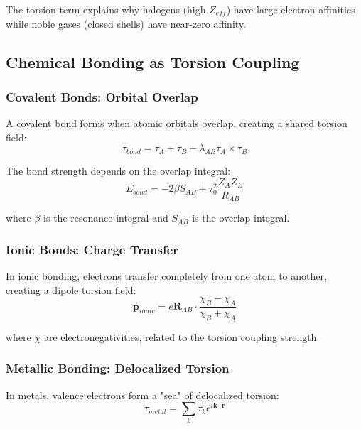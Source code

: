 The torsion term explains why halogens (high $Z_{eff}$) have large electron affinities while noble gases (closed shells) have near-zero affinity.

\subsection{Chemical Bonding as Torsion Coupling}

\subsubsection{Covalent Bonds: Orbital Overlap}

A covalent bond forms when atomic orbitals overlap, creating a shared torsion field:
\begin{equation}
    \tau_{bond} = \tau_A + \tau_B + \lambda_{AB} \tau_A \times \tau_B
\end{equation}

The bond strength depends on the overlap integral:
\begin{equation}
    E_{bond} = -2\beta S_{AB} + \tau_0^2 \frac{Z_A Z_B}{R_{AB}}
\end{equation}

where $\beta$ is the resonance integral and $S_{AB}$ is the overlap integral.

\subsubsection{Ionic Bonds: Charge Transfer}

In ionic bonding, electrons transfer completely from one atom to another, creating a dipole torsion field:
\begin{equation}
    \mathbf{p}_{ionic} = e \mathbf{R}_{AB} \cdot \frac{\chi_B - \chi_A}{\chi_B + \chi_A}
\end{equation}

where $\chi$ are electronegativities, related to the torsion coupling strength.

\subsubsection{Metallic Bonding: Delocalized Torsion}

In metals, valence electrons form a "sea" of delocalized torsion:
\begin{equation}
    \tau_{metal} = \sum_{k} \tau_k e^{i\mathbf{k} \cdot \mathbf{r}}
\end{equation}

